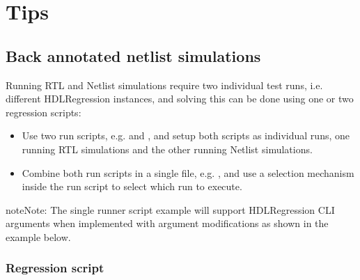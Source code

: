 \documentclass[letterpaper,10pt,english]{sphinxmanual}
\begin{document}
\sphinxstepscope


\chapter{Tips}
\label{\detokenize{tips:tips}}\label{\detokenize{tips::doc}}

\section{Back annotated netlist simulations}
\label{\detokenize{tips:back-annotated-netlist-simulations}}
\sphinxAtStartPar
Running RTL and Netlist simulations require two individual test runs, i.e. different HDLRegression instances, and solving
this can be done using one or two regression scripts:
\begin{itemize}
\item {} 
\sphinxAtStartPar
Use two run scripts, e.g.  and , and setup both scripts as individual runs,
one running RTL simulations and the other running Netlist simulations.

\item {} 
\sphinxAtStartPar
Combine both run scripts in a single file, e.g. , and use a selection mechanism inside the
run script to select which run to execute.

\end{itemize}

\begin{sphinxadmonition}{note}{Note:}
\sphinxAtStartPar
The single runner script example will support HDLRegression CLI arguments when implemented with
argument modifications as shown in the example below.
\end{sphinxadmonition}


\subsection{Regression script}
\label{\detokenize{tips:regression-script}}
\sphinxAtStartPar
{}

\begin{sphinxVerbatim}[commandchars=\\\{\}]
 

 
\end{sphinxVerbatim}
\end{document}
